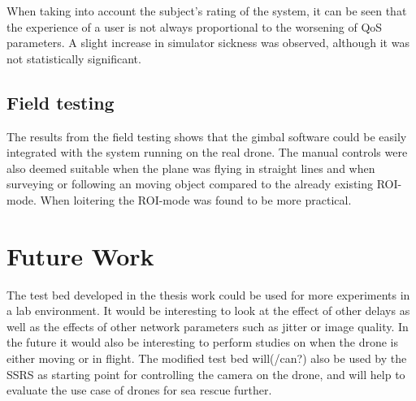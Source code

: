 \documentclass[nofilelist]{cslthse-msc}
\begin{document}
When taking into account the subject's rating of the system, it can be seen that the experience of a user is not always proportional to the worsening of QoS parameters. A slight increase in simulator sickness was observed, although it was not statistically significant.

\section{Field testing}
The results from the field testing shows that the gimbal software could be easily integrated with the system running on the real drone. The manual controls were also deemed suitable when the plane was flying in straight lines and when surveying or following an moving object compared to the already existing ROI-mode. When loitering the ROI-mode was found to be more practical.

\chapter{Future Work}
The test bed developed in the thesis work could be used for more experiments in a lab environment. It would be interesting to look at the effect of other delays as well as the effects of other network parameters such as jitter or image quality. In the future it would also be interesting to perform studies on when the drone is either moving or in flight.
The modified test bed will(/can?) also be used by the SSRS as starting point for controlling the camera on the drone, and will help to evaluate the use case of drones for sea rescue further.

{}
\end{document}
